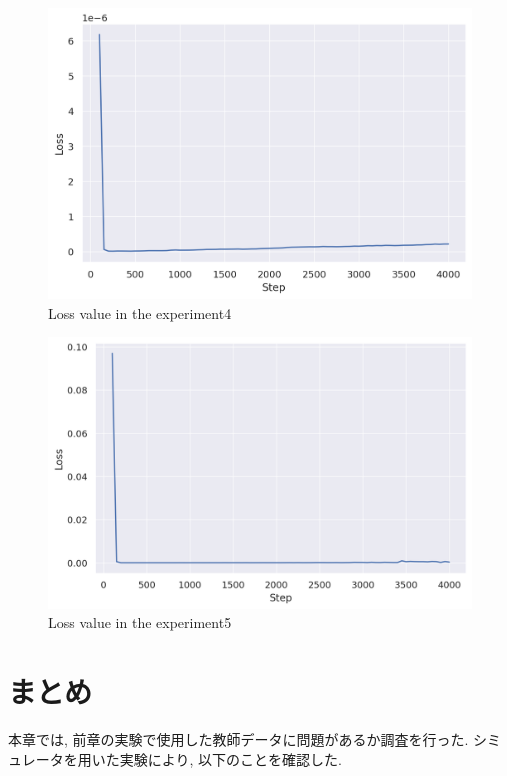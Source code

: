 \begin{figure}[h]
  \centering
  \includegraphics[keepaspectratio, scale=0.55]{images/00_02_rename_9.png}
  \caption{Loss value in the experiment4}
  \label{Fig:sample4}
\end{figure}

\begin{figure}[h]
  \centering
  \includegraphics[keepaspectratio, scale=0.55]{images/9cam_19.png}
  \caption{Loss value in the experiment5}
  \label{Fig:sample5}
\end{figure}

\newpage
\section{まとめ}
本章では, 前章の実験で使用した教師データに問題があるか調査を行った. シミュレータを用いた実験により, 以下のことを確認した.

